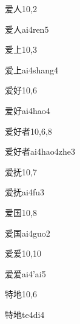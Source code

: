 \begin{entry}{爱人}{10,2}
  \begin{phonetics}{爱人}{ai4ren5}
  \end{phonetics}
\end{entry}

\begin{entry}{爱上}{10,3}
  \begin{phonetics}{爱上}{ai4shang4}
  \end{phonetics}
\end{entry}

\begin{entry}{爱好}{10,6}
  \begin{phonetics}{爱好}{ai4hao4}
  \end{phonetics}
\end{entry}

\begin{entry}{爱好者}{10,6,8}
  \begin{phonetics}{爱好者}{ai4hao4zhe3}
  \end{phonetics}
\end{entry}

\begin{entry}{爱抚}{10,7}
  \begin{phonetics}{爱抚}{ai4fu3}
  \end{phonetics}
\end{entry}

\begin{entry}{爱国}{10,8}
  \begin{phonetics}{爱国}{ai4guo2}
  \end{phonetics}
\end{entry}

\begin{entry}{爱爱}{10,10}
  \begin{phonetics}{爱爱}{ai4'ai5}
  \end{phonetics}
\end{entry}

\begin{entry}{特地}{10,6}
  \begin{phonetics}{特地}{te4di4}
  \end{phonetics}
\end{entry}

